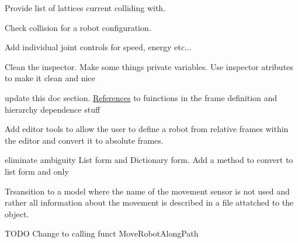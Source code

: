 \begin{DoxyRefList}
\label{todo__todo000005}%
%
Provide list of lattices current colliding with.

\label{todo__todo000006}%
%
Check collision for a robot configuration.  
\item[Class \mbox{\hyperlink{class_joint_class}{Joint\+Class}} ]\label{todo__todo000007}%
%
Add individual joint controls for speed, energy etc... 



Clean the inspector. Make some things private variables. Use inspector atributes to make it clean and nice

\label{todo__todo000008}%
%
update this doc section. \mbox{\hyperlink{class_references}{References}} to fuinctions in the frame definition and hierarchy dependence stuff

\label{todo__todo000009}%
%
Add editor tools to allow the user to define a robot from relative frames within the editor and convert it to absolute frames. 
\item[Class \mbox{\hyperlink{class_movement}{Movement}} ]\label{todo__todo000010}%
%
eliminate ambiguity List form and Dictionary form. Add a method to convert to list form and only  
\item[Member \mbox{\hyperlink{class_robot_script_aaaacc0eacd09c68f0e399dfb780c16a3}{Robot\+Script.Get\+Possible\+Movement\+Sensors}} ()]\label{todo__todo000011}%
%
Trsansition to a model where the name of the movement sensor is not used and rather all information about the movement is described in a file attatched to the object. ~\newline
  
\item[Member \mbox{\hyperlink{class_robot_script_a9213947f626c88acf4ce793020a9ef3d}{Robot\+Script.Move\+To\+Node}} (Game\+Object End\+Node)]\label{todo__todo000012}%
%
TODO Change to calling funct Move\+Robot\+Along\+Path 
\end{DoxyRefList}